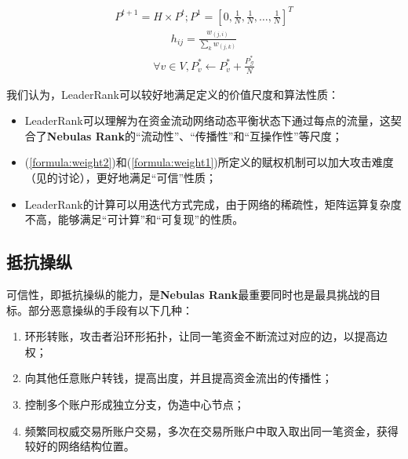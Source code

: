 \begin{align} \label{formula:iteration}
	P^{t+1} = H \times P^{t}; P^1=[0, \frac{1}{N}, \frac{1}{N}, \dots, \frac{1}{N}]^T
\end{align}
\begin{align} \label{formula:matrix}
	h_{ij} = \frac{w_{(j,i)}}{\sum_k w_{(j, k)}}
\end{align}
\begin{align} \label{formula:init}
\forall v \in V, P^*_v \leftarrow P^*_v + \frac{P^*_{\mathcal{G}}}{N}
\end{align}


我们认为，LeaderRank可以较好地满足定义的价值尺度和算法性质：
\begin{itemize}
	\item LeaderRank可以理解为在资金流动网络动态平衡状态下通过每点的流量，这契合了\textbf{Nebulas Rank}的“流动性”、“传播性”和“互操作性”等尺度；
	\item (\ref{formula:weight2})和(\ref{formula:weight1})所定义的赋权机制可以加大攻击难度（见的讨论），更好地满足“可信”性质；
	\item LeaderRank的计算可以用迭代方式完成，由于网络的稀疏性，矩阵运算复杂度不高，能够满足“可计算”和“可复现”的性质。
\end{itemize}


\subsection{抵抗操纵}\label{subsec:robust}

可信性，即抵抗操纵的能力，是\textbf{Nebulas Rank}最重要同时也是最具挑战的目标。部分恶意操纵的手段有以下几种：
\begin{enumerate}
	\item 环形转账，攻击者沿环形拓扑，让同一笔资金不断流过对应的边，以提高边权；
	\item 向其他任意账户转钱，提高出度，并且提高资金流出的传播性；
	\item 控制多个账户形成独立分支，伪造中心节点；
	\item 频繁同权威交易所账户交易，多次在交易所账户中取入取出同一笔资金，获得较好的网络结构位置。
\end{enumerate}

